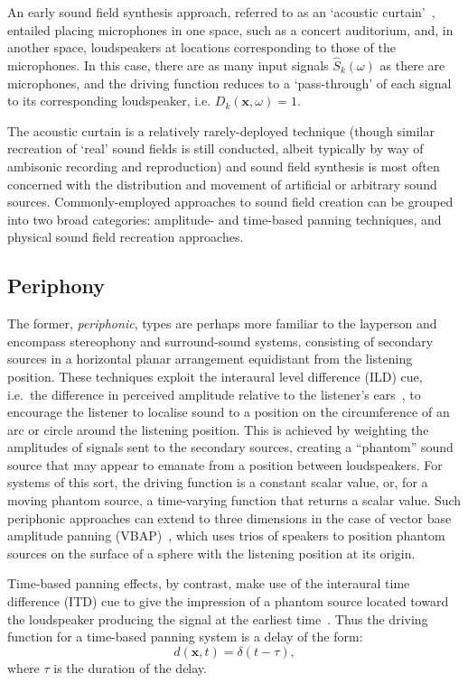An early sound field synthesis approach, referred to as an `acoustic
curtain'~\citep{ziemer_wave_2020}, entailed placing microphones in one space,
such as a concert auditorium, and, in another space, loudspeakers at locations
corresponding to those of the microphones.
In this case, there are as many input signals $\hat{S}_k(\omega)$ as there are
microphones, and the driving function reduces to a `pass-through' of each
signal to its corresponding loudspeaker, i.e. $D_k(\mathbf{x}, \omega) = 1$.

The acoustic curtain is a relatively rarely-deployed technique (though similar
recreation of `real' sound fields is still conducted, albeit typically by way
of ambisonic recording and reproduction) and sound field synthesis is most
often concerned with the distribution and movement of artificial or arbitrary
sound sources.
Commonly-employed approaches to sound field creation can be grouped into two
broad categories: amplitude- and time-based panning techniques, and physical
sound field recreation approaches.

\subsection{Periphony}\label{subsec:periphony}

The former, \textit{periphonic}, types are perhaps more familiar to the
layperson and encompass stereophony and surround-sound systems, consisting of
secondary sources in a horizontal planar arrangement equidistant from the
listening position.
These techniques exploit the interaural level difference (ILD) cue, i.e.\ the
difference in perceived amplitude relative to the listener's
ears~\citep{pulkki_virtual_1997,verheijen_sound_1998,ziemer_wave_2020}, to
encourage the listener to localise sound to a position on the circumference of
an arc or circle around the listening position.
This is achieved by weighting the amplitudes of signals sent to the
secondary sources, creating a ``phantom'' sound source that may appear to
emanate from a position between loudspeakers.
For systems of this sort, the driving function is a constant scalar value, or,
for a moving phantom source, a time-varying function that returns a scalar
value.
Such periphonic approaches can extend to three dimensions in the case of
vector base amplitude panning (VBAP)~\citep{pulkki_virtual_1997}, which uses
trios of speakers to position phantom sources on the surface of a sphere
with the listening position at its origin.

Time-based panning effects, by contrast, make use of the interaural time
difference (ITD) cue to give the impression of a phantom source located toward
the loudspeaker producing the signal at the earliest
time~\citep{pulkki_virtual_1997,verheijen_sound_1998}.
Thus the driving function for a time-based panning system is a delay of the
form:
\begin{equation}
    d(\mathbf{x},t) = \delta(t - \tau),
    \label{eq:time-driving-function}
\end{equation}
where $\tau$ is the duration of the delay.

